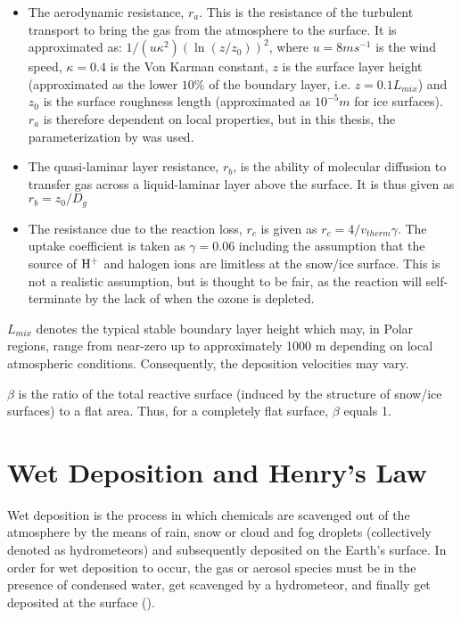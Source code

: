 \begin{itemize}
    \item The aerodynamic resistance, $r_a$. This is the resistance of the turbulent transport to bring the gas from the atmosphere to the surface. It is approximated as: $1/(u\kappa^2)(\ln(z/z_0))^2$, where $u = 8 ms^{-1}$ is the wind speed, $\kappa = 0.4$ is the Von Karman constant, $z$ is the surface layer height (approximated as the lower $10\%$ of the boundary layer, i.e. $z = 0.1 L_{mix}$) and $z_0$ is the surface roughness length (approximated as $10^{-5} m$ for ice surfaces). $r_a$ is therefore dependent on local properties, but in this thesis, the parameterization by \cite{CAO} was used. 
    \item The quasi-laminar layer resistance, $r_b$, is the ability of molecular diffusion to transfer gas across a liquid-laminar layer above the surface. It is thus given as $r_b = z_0/D_g$
    \item The resistance due to the reaction loss, $r_c$ is given as $r_c = 4/v_{therm}\gamma$. The uptake coefficient is taken as $\gamma = 0.06$ including the assumption that the source of $\mathrm{H^+}$ and halogen ions are limitless at the snow/ice surface. This is not a realistic assumption, but is thought to be fair, as the reaction will self-terminate by the lack of  when the ozone is depleted. 
\end{itemize}

$L_{mix}$ denotes the typical stable boundary layer height which may, in Polar regions, range from near-zero up to approximately 1000 m depending on local atmospheric conditions. Consequently, the deposition velocities may vary.

\medskip

$\beta$ is the ratio of the total reactive surface (induced by the structure of snow/ice surfaces) to a flat area. Thus, for a completely flat surface, $\beta$ equals 1. 




\section{Wet Deposition and Henry's Law}\label{sec:wet_dep_henrys_law}

Wet deposition is the process in which chemicals are scavenged out of the atmosphere by the means of rain, snow or cloud and fog droplets (collectively denoted as hydrometeors) and subsequently deposited on the Earth's surface. In order for wet deposition to occur, the gas or aerosol species must be in the presence of condensed water, get scavenged by a hydrometeor, and finally get deposited at the surface (\cite{SeinfeldSpyros}). 

